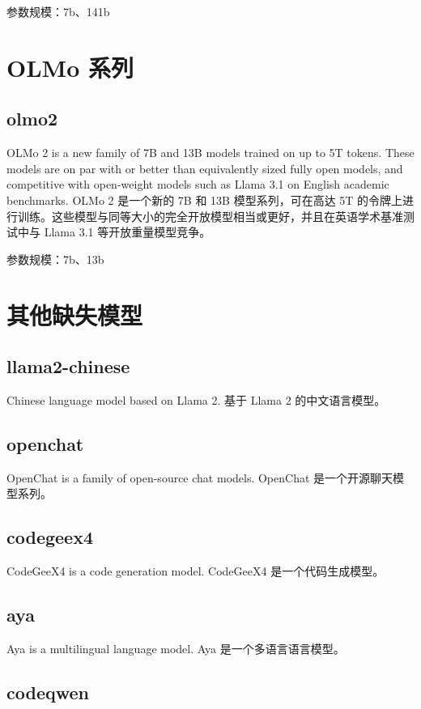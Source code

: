 \documentclass[12pt,UTF8]{ctexbook}
\begin{document}
参数规模：7b、141b

\section{OLMo 系列}

\subsection{olmo2}

OLMo 2 is a new family of 7B and 13B models trained on up to 5T tokens. These models are on par with or better than equivalently sized fully open models, and competitive with open-weight models such as Llama 3.1 on English academic benchmarks.
OLMo 2 是一个新的 7B 和 13B 模型系列，可在高达 5T 的令牌上进行训练。这些模型与同等大小的完全开放模型相当或更好，并且在英语学术基准测试中与 Llama 3.1 等开放重量模型竞争。

参数规模：7b、13b

\section{其他缺失模型}

\subsection{llama2-chinese}

Chinese language model based on Llama 2.
基于 Llama 2 的中文语言模型。

\subsection{openchat}

OpenChat is a family of open-source chat models.
OpenChat 是一个开源聊天模型系列。

\subsection{codegeex4}

CodeGeeX4 is a code generation model.
CodeGeeX4 是一个代码生成模型。

\subsection{aya}

Aya is a multilingual language model.
Aya 是一个多语言语言模型。

\subsection{codeqwen}
\end{document}
